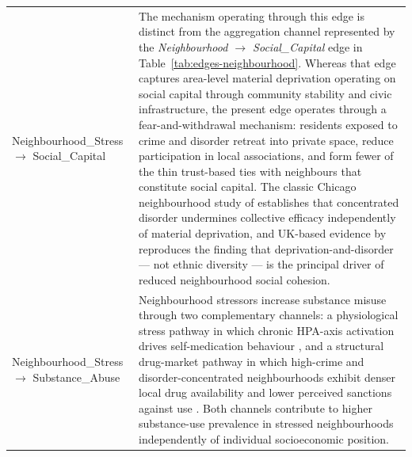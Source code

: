 \begin{longtable}{@{}p{3.8cm}p{11.2cm}@{}}
\addlinespace
Neighbourhood\_Stress $\to$ Social\_Capital & The mechanism operating through this edge is distinct from the aggregation channel represented by the \textit{Neighbourhood $\to$ Social\_Capital} edge in Table~\ref{tab:edges-neighbourhood}. Whereas that edge captures area-level material deprivation operating on social capital through community stability and civic infrastructure, the present edge operates through a fear-and-withdrawal mechanism: residents exposed to crime and disorder retreat into private space, reduce participation in local associations, and form fewer of the thin trust-based ties with neighbours that constitute social capital. The classic Chicago neighbourhood study of \citet{sampson_neighborhoods_1997} establishes that concentrated disorder undermines collective efficacy independently of material deprivation, and UK-based evidence by \citet{letki_does_2008} reproduces the finding that deprivation-and-disorder --- not ethnic diversity --- is the principal driver of reduced neighbourhood social cohesion. \\
\addlinespace
Neighbourhood\_Stress $\to$ Substance\_Abuse & Neighbourhood stressors increase substance misuse through two complementary channels: a physiological stress pathway in which chronic HPA-axis activation drives self-medication behaviour \citep{sinha_chronic_2008}, and a structural drug-market pathway in which high-crime and disorder-concentrated neighbourhoods exhibit denser local drug availability and lower perceived sanctions against use \citep{felker-kantor_neighbourhood_2019}. Both channels contribute to higher substance-use prevalence in stressed neighbourhoods independently of individual socioeconomic position. \\
\end{longtable}


